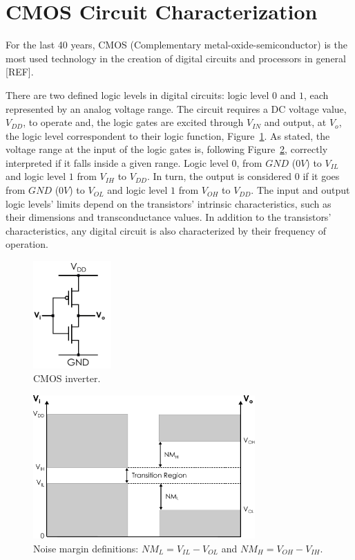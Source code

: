 \section{CMOS Circuit Characterization}
\label{section:CMOS}

For the last 40 years, CMOS (Complementary metal-oxide-semiconductor) is the most used technology in the creation of digital circuits and processors in general [REF]. 

There are two defined logic levels in digital circuits: logic level $0$ and $1$, each represented by an analog voltage range. The circuit requires a DC voltage value, $V_{DD}$, to operate and, the logic gates are excited through $V_{IN}$ and output, at $V_o$, the logic level correspondent to their logic function, Figure~\ref{fig:cmos}. As stated, the voltage range at the input of the logic gates is, following Figure~\ref{fig:cmos_noise_margin}, correctly interpreted if it falls inside a given range. Logic level $0$, from $GND$ ($0V$) to $V_{IL}$ and logic level $1$ from $V_{IH}$ to $V_{DD}$. In turn, the output is considered $0$ if it goes from $ GND $ ($0V$) to $V_{OL}$ and logic level $1$ from $V_{OH}$ to $V_{DD}$. The input and output logic levels' limits depend on the transistors' intrinsic characteristics, such as their dimensions and transconductance values. In addition to the transistors' characteristics, any digital circuit is also characterized by their frequency of operation.

\begin{figure}[htb]
    \centering
    \includegraphics[width=30mm]{Figures/Background/cmos_inverter.pdf}
    \caption{CMOS inverter.}
    \label{fig:cmos}
\end{figure}

\begin{figure}[htb]
    \centering
    \includegraphics[width=85mm]{Figures/Background/voltage_margin.pdf}
    \caption{Noise margin definitions: $NM_L=V_{IL}-V_{OL}$ and $NM_H=V_{OH}-V_{IH}$.}
    \label{fig:cmos_noise_margin}
\end{figure}


